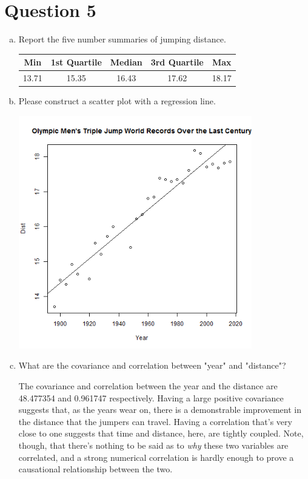 \documentclass{article}
\begin{document}
\section*{Question 5}
\begin{enumerate}[a)]
	\item Report the five number summaries of jumping distance.
	
	\begin{tabular}{|c|c|c|c|c|}
		\hline 
		Min & 1st Quartile & Median & 3rd Quartile & Max \\ 
		\hline 
		13.71 & 15.35 & 16.43 & 17.62 & 18.17 \\ 
		\hline 
	\end{tabular} \vspace{1em}

	\item Please construct a scatter plot with a regression line.\\
	\begin{center}\includegraphics[width=4in]{Q5.png}\end{center}
	\item What are the covariance and correlation between "year" and "distance"?
	
	The covariance and correlation between the year and the distance are 48.477354 and 0.961747 respectively. Having a large positive covariance suggests that, as the years wear on, there is a demonstrable improvement in the distance that the jumpers can travel. Having a correlation that's very close to one suggests that time and distance, here, are tightly coupled. Note, though, that there's nothing to be said as to \emph{why} these two variables are correlated, and a strong numerical correlation is hardly enough to prove a causational relationship between the two.
	
\end{enumerate}
\newpage
\end{document}
